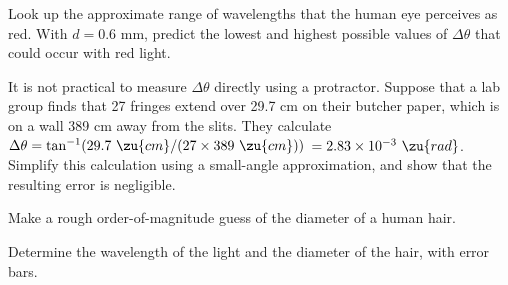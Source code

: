 \prelabquestion  Look up the approximate range of wavelengths that the human eye perceives as red.
With $d=0.6$ mm, predict the lowest and highest possible values of $\Delta\theta$
that could occur with red light.

\prelabquestion  It is not practical to measure $\Delta\theta$ directly using a
protractor. Suppose that a lab group finds that 27 fringes extend over 29.7 cm
on their butcher paper, which is on a wall 389 cm away from the slits. They
calculate $\Delta\theta=\tan^{-1}(29.7\ \zu{cm}/(27\times389\ \zu{cm}))$
$=2.83\times10^{-3}\ \zu{rad}$.
Simplify this calculation using a small-angle approximation, and show that the resulting
error is negligible.

\prelabquestion  Make a rough order-of-magnitude guess of the diameter of a human hair.

\analysis

Determine the wavelength of the light and the diameter of
the hair, with error bars.
